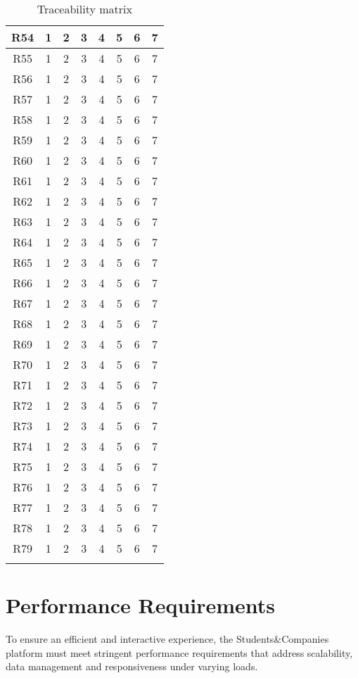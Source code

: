 \begin{longtable}{|c|c|c|c|c|c|c|c|}
    R54 & 1 & 2 & 3 & 4 & 5 & 6 & 7 \\ \hline
    R55 & 1 & 2 & 3 & 4 & 5 & 6 & 7 \\ \hline
    R56 & 1 & 2 & 3 & 4 & 5 & 6 & 7 \\ \hline
    R57 & 1 & 2 & 3 & 4 & 5 & 6 & 7 \\ \hline
    R58 & 1 & 2 & 3 & 4 & 5 & 6 & 7 \\ \hline
    R59 & 1 & 2 & 3 & 4 & 5 & 6 & 7 \\ \hline
    R60 & 1 & 2 & 3 & 4 & 5 & 6 & 7 \\ \hline
    R61 & 1 & 2 & 3 & 4 & 5 & 6 & 7 \\ \hline
    R62 & 1 & 2 & 3 & 4 & 5 & 6 & 7 \\ \hline
    R63 & 1 & 2 & 3 & 4 & 5 & 6 & 7 \\ \hline
    R64 & 1 & 2 & 3 & 4 & 5 & 6 & 7 \\ \hline
    R65 & 1 & 2 & 3 & 4 & 5 & 6 & 7 \\ \hline
    R66 & 1 & 2 & 3 & 4 & 5 & 6 & 7 \\ \hline
    R67 & 1 & 2 & 3 & 4 & 5 & 6 & 7 \\ \hline
    R68 & 1 & 2 & 3 & 4 & 5 & 6 & 7 \\ \hline
    R69 & 1 & 2 & 3 & 4 & 5 & 6 & 7 \\ \hline
    R70 & 1 & 2 & 3 & 4 & 5 & 6 & 7 \\ \hline
    R71 & 1 & 2 & 3 & 4 & 5 & 6 & 7 \\ \hline
    R72 & 1 & 2 & 3 & 4 & 5 & 6 & 7 \\ \hline
    R73 & 1 & 2 & 3 & 4 & 5 & 6 & 7 \\ \hline
    R74 & 1 & 2 & 3 & 4 & 5 & 6 & 7 \\ \hline
    R75 & 1 & 2 & 3 & 4 & 5 & 6 & 7 \\ \hline
    R76 & 1 & 2 & 3 & 4 & 5 & 6 & 7 \\ \hline
    R77 & 1 & 2 & 3 & 4 & 5 & 6 & 7 \\ \hline
    R78 & 1 & 2 & 3 & 4 & 5 & 6 & 7 \\ \hline
    R79 & 1 & 2 & 3 & 4 & 5 & 6 & 7 \\ \hline
\caption{Traceability matrix}
\end{longtable}

\section{Performance Requirements}
To ensure an efficient and interactive experience, the Students\&Companies platform must meet stringent performance requirements that address scalability, data management and responsiveness under varying loads.

